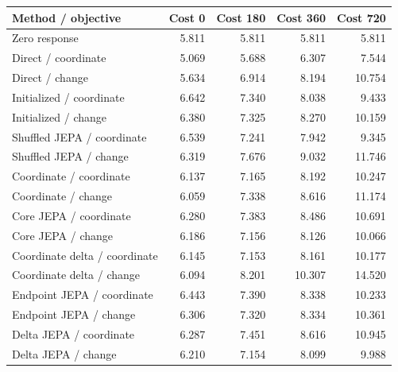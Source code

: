 \begin{tabular}{lrrrr}\toprule
Method / objective & Cost 0 & Cost 180 & Cost 360 & Cost 720\\\midrule
Zero response & 5.811 & 5.811 & 5.811 & 5.811 \\
Direct / coordinate & 5.069 & 5.688 & 6.307 & 7.544 \\
Direct / change & 5.634 & 6.914 & 8.194 & 10.754 \\
Initialized / coordinate & 6.642 & 7.340 & 8.038 & 9.433 \\
Initialized / change & 6.380 & 7.325 & 8.270 & 10.159 \\
Shuffled JEPA / coordinate & 6.539 & 7.241 & 7.942 & 9.345 \\
Shuffled JEPA / change & 6.319 & 7.676 & 9.032 & 11.746 \\
Coordinate / coordinate & 6.137 & 7.165 & 8.192 & 10.247 \\
Coordinate / change & 6.059 & 7.338 & 8.616 & 11.174 \\
Core JEPA / coordinate & 6.280 & 7.383 & 8.486 & 10.691 \\
Core JEPA / change & 6.186 & 7.156 & 8.126 & 10.066 \\
Coordinate delta / coordinate & 6.145 & 7.153 & 8.161 & 10.177 \\
Coordinate delta / change & 6.094 & 8.201 & 10.307 & 14.520 \\
Endpoint JEPA / coordinate & 6.443 & 7.390 & 8.338 & 10.233 \\
Endpoint JEPA / change & 6.306 & 7.320 & 8.334 & 10.361 \\
Delta JEPA / coordinate & 6.287 & 7.451 & 8.616 & 10.945 \\
Delta JEPA / change & 6.210 & 7.154 & 8.099 & 9.988 \\
\bottomrule\end{tabular}
